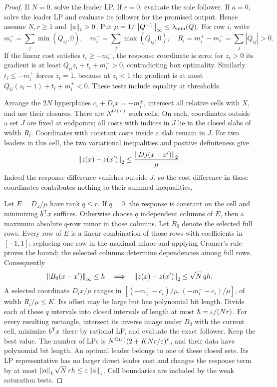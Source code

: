 \begin{proof}
If \(N=0\), solve the leader LP. If \(r=0\), evaluate the sole follower. If
\(a=0\), solve the leader LP and evaluate its follower for the promised output.
Hence assume \(N,r\ge1\) and \(\left\lVert a\right\rVert_1>0\). Put
\(\mu=1/\left\lVert Q^{-1}\right\rVert_\infty\le\lambda_{\min}(Q)\). For row \(i\), write
\[
 m_i^- =\sum_j\min(Q_{ij},0),\quad m_i^+=\sum_j\max(Q_{ij},0),\quad
 R_i=m_i^+-m_i^-=\sum_j|Q_{ij}|>0.
\]
If the linear cost satisfies \(t_i\ge-m_i^-\), the response coordinate is
zero:
for \(z_i>0\) its gradient is at least \(Q_{ii}z_i+t_i+m_i^->0\),
contradicting box optimality. Similarly \(t_i\le-m_i^+\) forces \(z_i=1\),
because at \(z_i<1\) the gradient is at most
\(Q_{ii}(z_i-1)+t_i+m_i^+<0\). These tests include equality at thresholds.

Arrange the \(2N\) hyperplanes \(c_i+D_ix=-m_i^\pm\), intersect all relative
cells with \(X\), and use their closures. There are \(N^{O(r)}\) such cells.
On each, coordinates outside a set \(J\) are fixed at endpoints; all costs
with indices in \(J\) lie in the closed slabs of width \(R_i\). Coordinates
with constant costs inside a slab remain in \(J\). For two leaders in this
cell, the two variational inequalities and positive definiteness give
\begin{equation}\label{eq:cost-grid-sensitivity}
 \left\lVert z(x)-z(x')\right\rVert_2\le\frac{\left\lVert D_J(x-x')\right\rVert_2}{\mu}.
\end{equation}
Indeed the response difference vanishes outside \(J\), so the cost difference
in those coordinates contributes nothing to their summed inequalities.

Let \(E=D_J/\mu\) have rank \(q\le r\). If \(q=0\), the response is constant
on the cell and minimizing \(b^{\mathsf T} x\) suffices. Otherwise choose \(q\)
independent columns of \(E\), then a maximum absolute \(q\)-row minor in those
columns. Let \(B_0\) denote the selected full rows. Every row of \(E\) is a
linear combination of those rows with coefficients in \([-1,1]\): replacing
one row in the maximal minor and applying Cramer's rule proves the bound;
the selected columns determine dependencies among full rows. Consequently
\[
 \left\lVert B_0(x-x')\right\rVert_\infty\le h
 \quad\Longrightarrow\quad \left\lVert z(x)-z(x')\right\rVert_2\le\sqrt N\,qh.
\]
A selected coordinate \(D_ix/\mu\) ranges in
\([(-m_i^+-c_i)/\mu,(-m_i^--c_i)/\mu]\), of width
\(R_i/\mu\le K\). Its offset may be large but has polynomial bit length.
Divide each of these \(q\) intervals into closed intervals of length at most
\(h=\varepsilon/(Nr)\). For every resulting rectangle, intersect its inverse image
under \(B_0\) with the current cell, minimize \(b^{\mathsf T} x\) there by rational
LP, and evaluate the exact follower. Keep the best value. The number of LPs is
\(N^{O(r)}(2+KNr/\varepsilon)^r\), and their data have polynomial bit length.
An optimal leader belongs to one of these closed sets. Its LP representative
has no larger direct leader cost and changes the response term by at most
\(\left\lVert a\right\rVert_1\sqrt N\,rh\le\varepsilon\left\lVert a\right\rVert_1\). Cell boundaries are included by the
weak saturation tests.


\end{proof}
